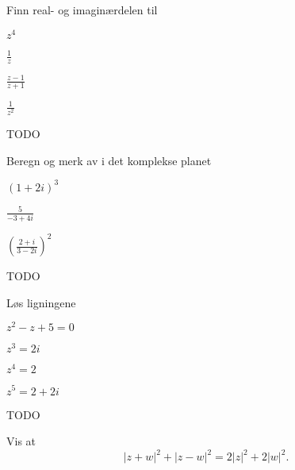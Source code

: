 

\begin{oppgave}
Finn real- og imaginærdelen til
\begin{punkt}
$z^4$ 
\end{punkt}
\begin{punkt}
$\frac{1}{z}$ 
\end{punkt}
\begin{punkt}
$\frac{z-1}{z+1}$ 
\end{punkt}
\begin{punkt}
$\frac{1}{z^2}$ 
\end{punkt}
\end{oppgave}

\begin{losning}
TODO
\end{losning}


\begin{oppgave}
Beregn og merk av i det komplekse planet
\begin{punkt}
$(1+2i)^3$ 
\end{punkt}
\begin{punkt}
$\frac{5}{-3+4i}$  
\end{punkt}
\begin{punkt}
$\left(\frac{2+i}{3-2i}\right)^2$
\end{punkt}
\end{oppgave}

\begin{losning}
TODO
\end{losning}

\begin{oppgave}
Løs ligningene

\begin{punkt}
$z^2-z+5=0$ 
\end{punkt}
\begin{punkt}
$z^3=2i$
\end{punkt}
\begin{punkt}
$z^4=2 $
\end{punkt}
\begin{punkt}
$z^5=2+2i$
\end{punkt}
\end{oppgave}

\begin{losning}
TODO
\end{losning}



\begin{oppgave}
Vis at 
\[
|z+w|^2+|z-w|^2=2|z|^2+2|w|^2.
\]
\end{oppgave}



